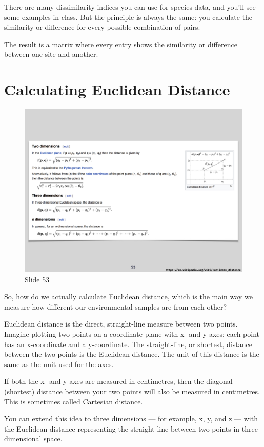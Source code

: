 \documentclass[
  12pt,
]{book}
\begin{document}
There are many dissimilarity indices you can use for species data, and
you'll see some examples in class. But the principle is always the same:
you calculate the similarity or difference for every possible
combination of pairs.

The result is a matrix where every entry shows the similarity or
difference between one site and another.

\section{Calculating Euclidean
Distance}\label{calculating-euclidean-distance}

\begin{figure}[ht]
\centering
\includegraphics[width=0.8\linewidth]{../images/BDC334/BDC334-053.jpeg}
\caption*{Slide 53}
\end{figure}

So, how do we actually calculate Euclidean distance, which is the main
way we measure how different our environmental samples are from each
other?

Euclidean distance is the direct, straight-line measure between two
points. Imagine plotting two points on a coordinate plane with x- and
y-axes; each point has an x-coordinate and a y-coordinate. The
straight-line, or shortest, distance between the two points is the
Euclidean distance. The unit of this distance is the same as the unit
used for the axes.

If both the x- and y-axes are measured in centimetres, then the diagonal
(shortest) distance between your two points will also be measured in
centimetres. This is sometimes called Cartesian distance.

You can extend this idea to three dimensions --- for example, x, y, and
z --- with the Euclidean distance representing the straight line between
two points in three-dimensional space.
\end{document}
